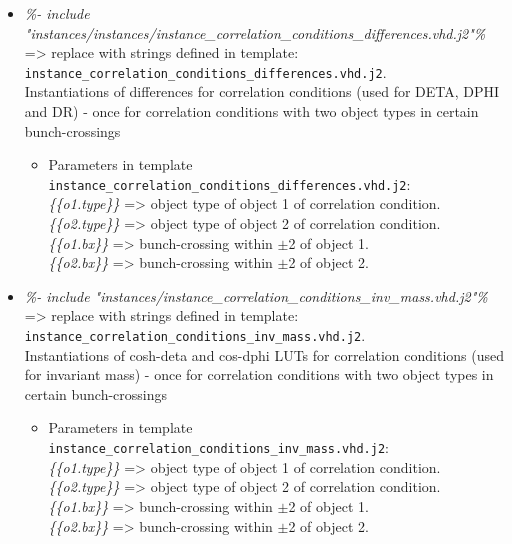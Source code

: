 \begin{itemize}
\item \textit{{\%- include "instances/instances/instance\_correlation\_conditions\_differences.vhd.j2"\%}} => replace with strings defined in template:\\
\texttt{instance\_correlation\_conditions\_differences.vhd.j2}.\\ 
Instantiations of differences for correlation conditions (used for DETA, DPHI and DR) - once for correlation conditions with two object types in certain bunch-crossings
    \begin{itemize}
    \item Parameters in template\\ \texttt{instance\_correlation\_conditions\_differences.vhd.j2}:\\
    \textit{\{\{o1.type\}\}} => object type of object 1 of correlation condition.\\ 
    \textit{\{\{o2.type\}\}} => object type of object 2 of correlation condition.\\ 
    \textit{\{\{o1.bx\}\}} => bunch-crossing within $\pm$2 of object 1.\\
    \textit{\{\{o2.bx\}\}} => bunch-crossing within $\pm$2 of object 2.
    \end{itemize}
\end{itemize}
\begin{itemize}
\item \textit{{\%- include "instances/instance\_correlation\_conditions\_inv\_mass.vhd.j2"\%}} => replace with strings defined in template:\\
\texttt{instance\_correlation\_conditions\_inv\_mass.vhd.j2}.\\ 
Instantiations of cosh-deta and cos-dphi LUTs for correlation conditions (used for invariant mass) - once for correlation conditions with two object types in certain bunch-crossings
    \begin{itemize}
    \item Parameters in template\\ \texttt{instance\_correlation\_conditions\_inv\_mass.vhd.j2}:\\
    \textit{\{\{o1.type\}\}} => object type of object 1 of correlation condition.\\ 
    \textit{\{\{o2.type\}\}} => object type of object 2 of correlation condition.\\ 
    \textit{\{\{o1.bx\}\}} => bunch-crossing within $\pm$2 of object 1.\\
    \textit{\{\{o2.bx\}\}} => bunch-crossing within $\pm$2 of object 2.
    \end{itemize}
\end{itemize}
